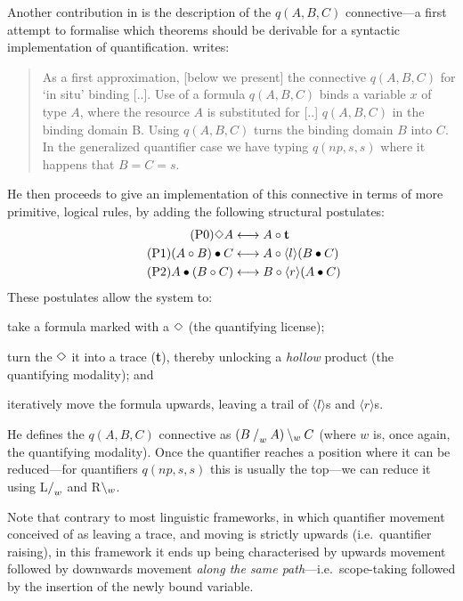 Another contribution in \citet{moortgat1996} is the description of the
$q(A,B,C)$ connective---a first attempt to formalise which theorems
should be derivable for a syntactic implementation of quantification.
\citeauthor{moortgat1996} writes:
\begin{quote}
  As a first approximation, [below we present] the connective $q(A, B,
  C)$ for `in situ' binding [..]. Use of a formula $q(A,B,C)$ binds a
  variable $x$ of type $A$, where the resource $A$ is substituted for
  [..] $q(A, B, C)$ in the binding domain B. Using $q(A,B,C)$ turns
  the binding domain $B$ into $C$. In the generalized quantifier case
  we have typing $q(np, s, s)$ where it happens that $B = C = s$.
\end{quote}
\begin{pfblock}
\end{pfblock}
He then proceeds to give an implementation of this connective in terms
of more primitive, logical rules, by adding the following structural
postulates:
\begin{align}
  \tag{P0}
  \Diamond A
  &\longleftrightarrow
  A\mathbin{\circ}\mathbf{t}
  \label{eqn:mmp0}
  \\
  \tag{P1}
  (A\mathbin{\circ} B)\bullet C
  &\longleftrightarrow
  A\mathbin{\circ}\langle l\rangle(B\bullet C)
  \label{eqn:mmp1}
  \\
  \tag{P2}
  A\bullet(B\mathbin{\circ} C)
  &\longleftrightarrow
  B\mathbin{\circ}\langle r\rangle(A\bullet C)
  \label{eqn:mmp2}
\end{align}
These postulates allow the system to:
\begin{enumerate*}[label=(\arabic*)]
\item take a formula marked with a $\Diamond$ (the quantifying license);
\item turn the $\Diamond$ it into a trace (\textbf{t}), thereby unlocking a
  \emph{hollow} product (the quantifying modality); and
\item iteratively move the formula upwards, leaving a trail of
  $\langle l\rangle$s and $\langle r\rangle$s.
\end{enumerate*}
He defines the $q(A,B,C)$ connective as $(B\mathbin{\slash}_w A)\mathbin{\backslash}_w C$ (where
$w$ is, once again, the quantifying modality). Once the quantifier
reaches a position where it can be reduced---for quantifiers
$q(np,s,s)$ this is usually the top---we can reduce it using
L$\mathbin{\slash}_w$ and R$\mathbin{\backslash}_w$.

Note that contrary to most linguistic frameworks, in which quantifier
movement conceived of as leaving a trace, and moving is strictly
upwards (i.e.\ quantifier raising), in this framework it ends up being
characterised by upwards movement followed by downwards movement
\emph{along the same path}---i.e.\ scope-taking followed by the
insertion of the newly bound variable.

